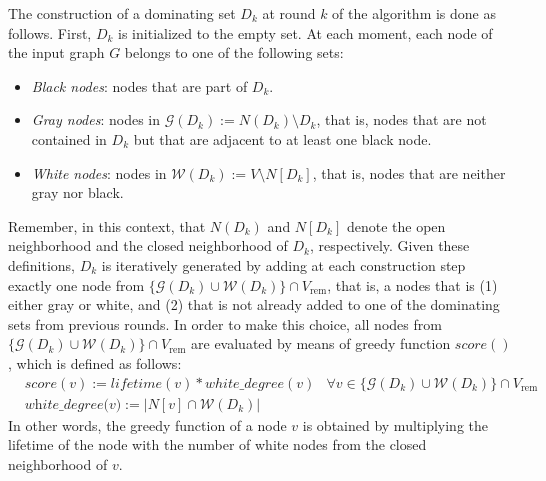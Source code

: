 \documentclass[algorithms,article,accept,moreauthors,pdftex]{Definitions/mdpi}
\begin{document}
The construction of a dominating set $D_k$ at round $k$ of the algorithm is done as follows. First, $D_k$ is initialized to the empty set. At each moment, each node of the input graph $G$ belongs to one of the following sets:
\begin{itemize}
  \item  \textit{Black  nodes}: nodes that are part of $D_k$.
  \item  \textit{Gray nodes}: nodes in $\mathcal{G}(D_k) := N(D_k) \setminus D_k$, that is, nodes that are not contained in $D_k$ but that are adjacent to at least one black node.
  \item  \textit{White nodes}: nodes in $\mathcal{W}(D_k) := V \setminus N[D_k]$, that is, nodes that are neither gray nor black.
\end{itemize} 
Remember, in this context, that $N(D_k)$ and $N[D_k]$ denote the open neighborhood and the closed neighborhood of $D_k$, respectively. Given these definitions, $D_k$ is iteratively generated by adding at each construction step exactly one node from $\{\mathcal{G}(D_k) \cup \mathcal{W}(D_k)\} \cap V_{\mathrm{rem}}$, that is, a nodes that is (1) either gray or white, and (2) that is not already added to one of the dominating sets from previous rounds. In order to make this choice, all nodes from $\{\mathcal{G}(D_k) \cup \mathcal{W}(D_k)\} \cap V_{\mathrm{rem}}$ are evaluated by means of greedy function $\textit{score}()$, which is defined as follows:
\begin{align}
	&  \textit{score} (v) :=  lifetime(v) * white\_degree(v)  &  \forall v \in \{\mathcal{G}(D_k) \cup \mathcal{W}(D_k)\} \cap V_{\mathrm{rem}} &   \label{eq3:1} \\
	&  \textit{white\_degree(v)} := \vert N[v] \cap \mathcal{W}(D_k)  \vert &  \label{eq3:2} 
\end{align}
In other words, the greedy function of a node $v$ is obtained by multiplying the lifetime of the node with the number of white nodes from the closed neighborhood of $v$.

\end{document}
